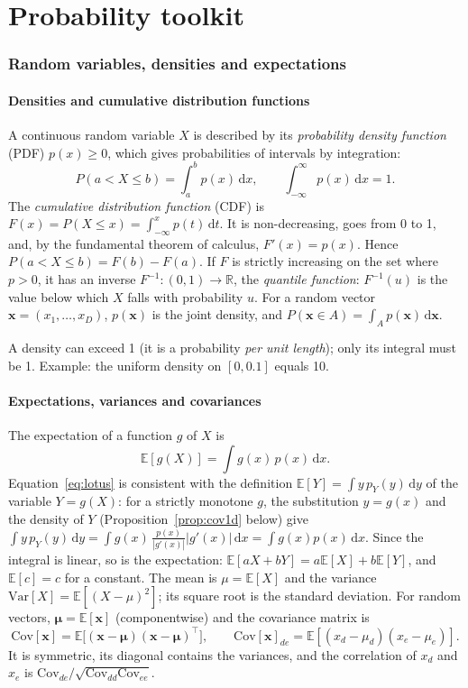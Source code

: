 \documentclass[11pt,a4paper]{article}
\numberwithin{equation}{section}
\theoremstyle{plain}
\theoremstyle{definition}
\theoremstyle{remark}
\newcommand{\x}{\mathbf{x}}
\newcommand{\mub}{\bm{\mu}}
\newcommand{\E}{\mathbb{E}}
\newcommand{\R}{\mathbb{R}}
\newcommand{\Var}{\mathrm{Var}}
\newcommand{\Cov}{\mathrm{Cov}}
\newcommand{\dd}{\,\mathrm{d}}
\begin{document}
\part{Probability toolkit}
\label{part:tools}

\section{Random variables, densities and expectations}
\label{sec:tools}

\subsection{Densities and cumulative distribution functions}
A continuous random variable $X$ is described by its \emph{probability density function} (PDF) $p(x)\ge0$, which gives probabilities of intervals by integration:
\begin{equation}
P(a<X\le b)=\int_a^bp(x)\dd x,\qquad \int_{-\infty}^{\infty}p(x)\dd x=1.
\end{equation}
The \emph{cumulative distribution function} (CDF) is $F(x)=P(X\le x)=\int_{-\infty}^xp(t)\dd t$. It is non-decreasing, goes from 0 to 1, and, by the fundamental theorem of calculus, $F'(x)=p(x)$.
Hence $P(a<X\le b)=F(b)-F(a)$.
If $F$ is strictly increasing on the set where $p>0$, it has an inverse $F^{-1}:(0,1)\to\R$, the \emph{quantile function}: $F^{-1}(u)$ is the value below which $X$ falls with probability $u$.
For a random vector $\x=(x_1,\dots,x_D)$, $p(\x)$ is the joint density, and $P(\x\in A)=\int_Ap(\x)\dd\x$.

A density can exceed 1 (it is a probability \emph{per unit length}); only its integral must be 1. Example: the uniform density on $[0,0.1]$ equals 10.

\subsection{Expectations, variances and covariances}
The expectation of a function $g$ of $X$ is
\begin{equation}
\E[g(X)]=\int g(x)\,p(x)\dd x.
\label{eq:lotus}
\end{equation}
Equation~\eqref{eq:lotus} is consistent with the definition $\E[Y]=\int y\,p_Y(y)\dd y$ of the variable $Y=g(X)$: for a strictly monotone $g$, the substitution $y=g(x)$ and the density of $Y$ (Proposition~\ref{prop:cov1d} below) give $\int y\,p_Y(y)\dd y=\int g(x)\,\frac{p(x)}{|g'(x)|}|g'(x)|\dd x=\int g(x)p(x)\dd x$.
Since the integral is linear, so is the expectation: $\E[aX+bY]=a\E[X]+b\E[Y]$, and $\E[c]=c$ for a constant.
The mean is $\mu=\E[X]$ and the variance $\Var[X]=\E[(X-\mu)^2]$; its square root is the standard deviation.
For random vectors, $\mub=\E[\x]$ (componentwise) and the covariance matrix is
\begin{equation}
\Cov[\x]=\E\big[(\x-\mub)(\x-\mub)^\top\big],\qquad \Cov[\x]_{de}=\E[(x_d-\mu_d)(x_e-\mu_e)].
\end{equation}
It is symmetric, its diagonal contains the variances, and the correlation of $x_d$ and $x_e$ is $\Cov_{de}/\sqrt{\Cov_{dd}\Cov_{ee}}$.
\end{document}
